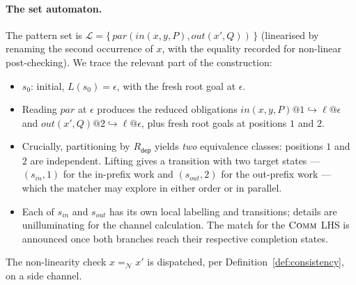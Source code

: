 \documentclass[11pt]{article}
\theoremstyle{plain}
\theoremstyle{definition}
\theoremstyle{remark}
\newcommand{\Names}{\mathcal{N}}
\newcommand{\Lhs}{\mathcal{L}}
\newcommand{\rdep}{R_{\mathsf{dep}}}
\begin{document}
\paragraph{The set automaton.}
The pattern set is $\Lhs = \{\,\mathit{par}(\mathit{in}(x, y, P),
\mathit{out}(x', Q))\,\}$ (linearised by renaming the second occurrence
of $x$, with the equality recorded for non-linear post-checking). We
trace the relevant part of the construction:
\begin{itemize}[leftmargin=*]
  \item $s_{0}$: initial, $L(s_{0}) = \epsilon$, with the fresh root
        goal at $\epsilon$.
  \item Reading $\mathit{par}$ at $\epsilon$ produces the reduced
        obligations $\mathit{in}(x, y, P)@1 \hookrightarrow \ell
        @\epsilon$ and $\mathit{out}(x', Q)@2 \hookrightarrow
        \ell@\epsilon$, plus fresh root goals at positions $1$ and $2$.
  \item Crucially, partitioning by $\rdep$ yields \emph{two}
        equivalence classes: positions $1$ and $2$ are independent.
        Lifting gives a transition with two target states ---
        $(s_{\mathit{in}}, 1)$ for the in-prefix work and
        $(s_{\mathit{out}}, 2)$ for the out-prefix work --- which the
        matcher may explore in either order or in parallel.
  \item Each of $s_{\mathit{in}}$ and $s_{\mathit{out}}$ has its own
        local labelling and transitions; details are unilluminating for
        the channel calculation. The match for the $\textsc{Comm}$
        LHS is announced once both branches reach their respective
        completion states.
\end{itemize}
The non-linearity check $x =_{\Names} x'$ is dispatched, per
Definition~\ref{def:consistency}, on a side channel.
\end{document}
